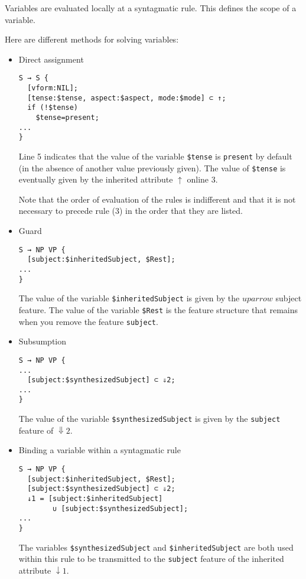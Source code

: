 \documentclass[11pt]{article}
\begin{document}
Variables are evaluated locally at a syntagmatic rule. This
defines the scope of a variable.

Here are different methods for solving variables:

\begin{itemize}
\item Direct assignment
\begin{lstlisting}
S → S {
  [vform:NIL];
  [tense:$tense, aspect:$aspect, mode:$mode] ⊂ ↑;
  if (!$tense)
    $tense=present;
...
}
\end{lstlisting}
Line 5 indicates that the value of the variable \verb#$tense# is
\verb#present# by default (in the absence of another value previously given). The
value of
\verb#$tense# is eventually given by the inherited attribute
$\uparrow$ online 3.

Note that the order of evaluation of the rules is indifferent and that it
is not necessary to precede rule (3) in the order that they are listed.

\item Guard
\begin{lstlisting}[numbers=none]
S → NP VP {
  [subject:$inheritedSubject, $Rest];
...
}
\end{lstlisting}

The value of the variable \verb#$inheritedSubject# is given 
by the $uparrow$ subject feature. The value of the variable 
\verb#$Rest# is the feature structure that remains when you remove the
feature \verb#subject#.

\item Subsumption
\begin{lstlisting}[numbers=none]
S → NP VP {
...
  [subject:$synthesizedSubject] ⊂ ⇓2;
...
}
\end{lstlisting}

The value of the variable \verb#$synthesizedSubject# is given 
by the \verb#subject# feature of $\Downarrow2$. 

\item Binding a variable within a syntagmatic rule
\begin{lstlisting}[numbers=none]
S → NP VP {
  [subject:$inheritedSubject, $Rest];
  [subject:$synthesizedSubject] ⊂ ⇓2;
  ↓1 = [subject:$inheritedSubject] 
  		∪ [subject:$synthesizedSubject];
...
}
\end{lstlisting}

The variables \verb#$synthesizedSubject# and \verb#$inheritedSubject#
are both used within this rule to be
transmitted to the \verb#subject# feature of the inherited attribute $\downarrow1$.


\end{itemize}
\end{document}
